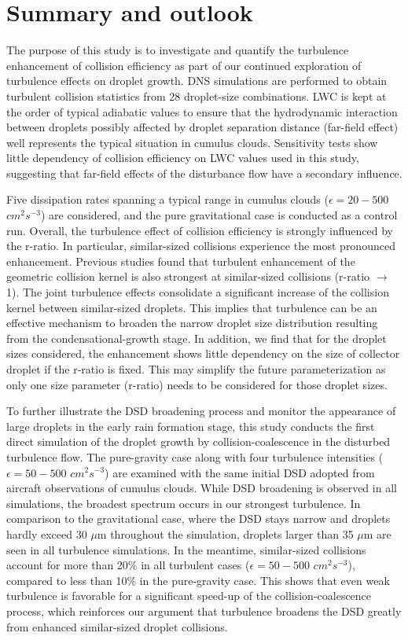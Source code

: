 \section{Summary and outlook} \label{sec:ch3_conclusion}

The purpose of this study is to investigate and quantify the turbulence enhancement of collision efficiency as part of our continued exploration of turbulence effects on droplet growth. DNS simulations are performed to obtain turbulent collision statistics from 28 droplet-size combinations. LWC is kept at the order of typical adiabatic values to ensure that the hydrodynamic interaction between droplets possibly affected by droplet separation distance (far-field effect) well represents the typical situation in cumulus clouds. Sensitivity tests show little dependency of collision efficiency on LWC values used in this study, suggesting that far-field effects of the disturbance flow have a secondary influence. 

Five dissipation rates spanning a typical range in cumulus clouds ($\epsilon = 20-500$ $cm^2s^{-3}$) are considered, and the pure gravitational case is conducted as a control run. Overall, the turbulence effect of collision efficiency is strongly influenced by the r-ratio. In particular, similar-sized collisions experience the most pronounced enhancement. Previous studies found that turbulent enhancement of the geometric collision kernel is also strongest at similar-sized collisions (r-ratio $\rightarrow$ 1). The joint turbulence effects consolidate a significant increase of the collision kernel between similar-sized droplets. This implies that turbulence can be an effective mechanism to broaden the narrow droplet size distribution resulting from the condensational-growth stage. In addition, we find that for the droplet sizes considered, the enhancement shows little dependency on the size of collector droplet if the r-ratio is fixed. This may simplify the future parameterization as only one size parameter (r-ratio) needs to be considered for those droplet sizes. 


To further illustrate the DSD broadening process and monitor the appearance of large droplets in the early rain formation stage, this study conducts the first direct simulation of the droplet growth by collision-coalescence in the disturbed turbulence flow. The pure-gravity case along with four turbulence intensities ($\epsilon = 50-500$ $cm^2s^{-3}$) are examined with the same initial DSD adopted from aircraft observations of cumulus clouds. While DSD broadening is observed in all simulations, the broadest spectrum occurs in our strongest turbulence. In comparison to the gravitational case, where the DSD stays narrow and droplets hardly exceed 30 $\mu$m throughout the simulation, droplets larger than 35 $\mu$m are seen in all turbulence simulations. In the meantime, similar-sized collisions account for more than 20\% in all turbulent cases ($\epsilon = 50-500$ $cm^2s^{-3}$), compared to less than 10\% in the pure-gravity case. This shows that even weak turbulence is favorable for a significant speed-up of the collision-coalescence process, which reinforces our argument that turbulence broadens the DSD greatly from enhanced similar-sized droplet collisions. 

